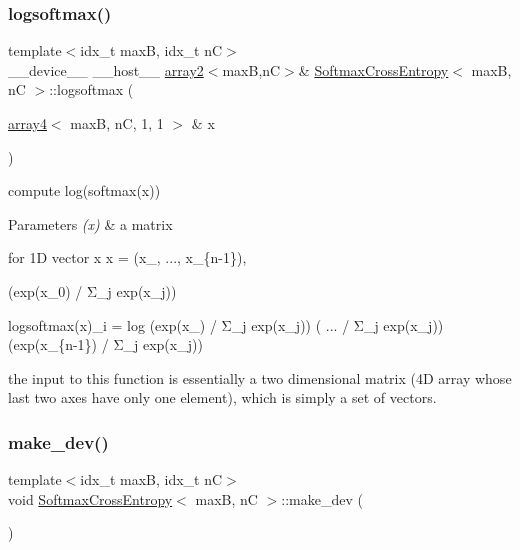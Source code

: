 \subsubsection{\texorpdfstring{logsoftmax()}{logsoftmax()}}
{\footnotesize\ttfamily template$<$idx\+\_\+t maxB, idx\+\_\+t nC$>$ \\
\+\_\+\+\_\+device\+\_\+\+\_\+ \+\_\+\+\_\+host\+\_\+\+\_\+ \hyperlink{structarray2}{array2}$<$maxB,nC$>$\& \hyperlink{structSoftmaxCrossEntropy}{Softmax\+Cross\+Entropy}$<$ maxB, nC $>$\+::logsoftmax (\begin{DoxyParamCaption}\item[{\hyperlink{structarray4}{array4}$<$ maxB, nC, 1, 1 $>$ \&}]{x }\end{DoxyParamCaption})\hspace{0.3cm}{\ttfamily [inline]}}



compute log(softmax(x)) 


\begin{DoxyParams}{Parameters}
{\em (x)} & a matrix\\
\hline
\end{DoxyParams}
for 1D vector x x = (x\+\_, ..., x\+\_\+\{n-\/1\}), \begin{DoxyVerb}                  (exp(x_0)     / Σ_j exp(x_j))
\end{DoxyVerb}
 logsoftmax(x)\+\_\+i = log (exp(x\+\_) / Σ\+\_\+j exp(x\+\_\+j)) ( ... / Σ\+\_\+j exp(x\+\_\+j)) (exp(x\+\_\+\{n-\/1\}) / Σ\+\_\+j exp(x\+\_\+j))

the input to this function is essentially a two dimensional matrix (4D array whose last two axes have only one element), which is simply a set of vectors. \mbox{\label{structSoftmaxCrossEntropy_ae02a6267c117629143f37216cad345a0}} 
\subsubsection{\texorpdfstring{make\+\_\+dev()}{make\_dev()}}
{\footnotesize\ttfamily template$<$idx\+\_\+t maxB, idx\+\_\+t nC$>$ \\
void \hyperlink{structSoftmaxCrossEntropy}{Softmax\+Cross\+Entropy}$<$ maxB, nC $>$\+::make\+\_\+dev (\begin{DoxyParamCaption}{ }\end{DoxyParamCaption})\hspace{0.3cm}{\ttfamily [inline]}}




